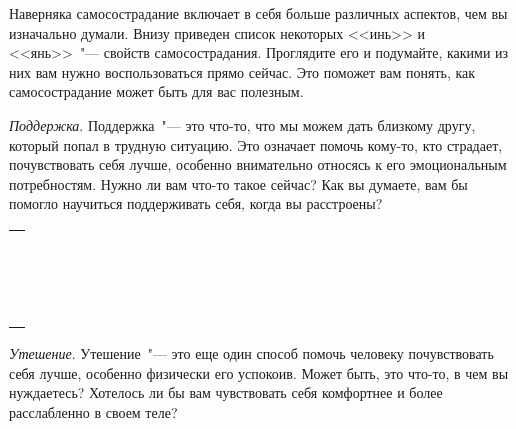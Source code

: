 \newpage
{}

Наверняка самосострадание включает в себя больше различных аспектов, чем вы изначально думали. Внизу приведен список некоторых <<инь>> и <<янь>>~"--- свойств самосострадания. Проглядите его и подумайте, какими из них вам нужно воспользоваться прямо сейчас. Это поможет вам понять, как самосострадание может быть для вас полезным.

\vspace{3ex}

\begin{itemize}
	\itemyinyang \textit{Поддержка}. Поддержка~"--- это что-то, что мы можем дать близкому другу, который попал в трудную ситуацию. Это означает помочь кому-то, кто страдает, почувствовать себя лучше, особенно внимательно относясь к его эмоциональным потребностям. Нужно ли вам что-то такое сейчас? Как вы думаете, вам бы помогло научиться поддерживать себя, когда вы расстроены?
\end{itemize}

\setlength{\extrarowheight}{2mm}
\begin{tabularx}{\textwidth}{X}
	\\
	\arrayrulecolor{gray}\hline\\
	\hline\\
	\hline\\
	\hline\\
	\hline\\
	\hline\\
	\hline\\
	\hline\\
	\hline\\
	\hline\\
	\hline\\
	\hline\\
	\hline\\
	\hline\\
	\hline\\
	\hline\\
	\hline\\	
\end{tabularx}
\setlength{\extrarowheight}{0mm}

\begin{itemize}
	\itemyinyang \textit{Утешение}. Утешение~"--- это еще один способ помочь человеку почувствовать себя лучше, особенно физически его успокоив. Может быть, это что-то, в чем вы нуждаетесь? Хотелось ли бы вам чувствовать себя комфортнее и более расслабленно в своем теле? 
\end{itemize}

